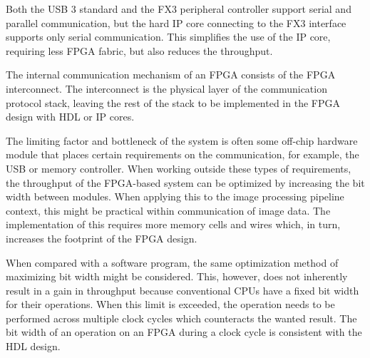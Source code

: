 \documentclass[12pt]{report}
\begin{document}
Both the USB 3 standard and the FX3 peripheral controller support serial and parallel communication, but the hard IP core connecting to the FX3 interface supports only serial communication. This simplifies the use of the IP core, requiring less FPGA fabric, but also reduces the throughput. \citep{XEM7305Man} \citep{FX3Man}

\par
The internal communication mechanism of an FPGA consists of the FPGA interconnect. The interconnect is the physical layer of the communication protocol stack, leaving the rest of the stack to be implemented in the FPGA design with HDL or IP cores. 
\par
The limiting factor and bottleneck of the system is often some off-chip hardware module that places certain requirements on the communication, for example, the USB or memory controller. When working outside these types of requirements, the throughput of the FPGA-based system can be optimized by increasing the bit width between modules. When applying this to the image processing pipeline context, this might be practical within communication of image data. The implementation of this requires more memory cells and wires which, in turn, increases the footprint of the FPGA design.
\par
When compared with a software program, the same optimization method of maximizing bit width might be considered. This, however, does not inherently result in a gain in throughput because conventional CPUs have a fixed bit width for their operations. When this limit is exceeded, the operation needs to be performed across multiple clock cycles which counteracts the wanted result. The bit width of an operation on an FPGA during a clock cycle is consistent with the HDL design. 
\par
\end{document}
